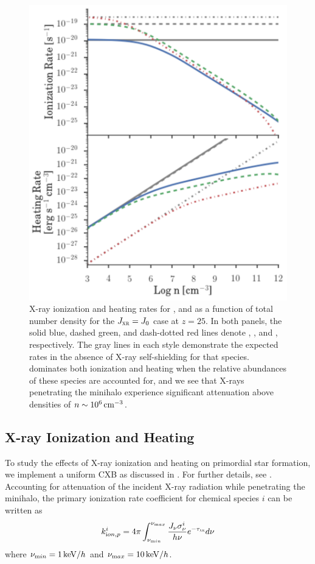 \documentclass[../thesis.tex]{subfiles}
\begin{document}
\begin{figure}
\begin{center}
\includegraphics[width=\columnwidth]{figures/khrates/khratesXR}
\caption{\label{fig:khratesXR}
X-ray ionization and heating rates for \HI, \HeI and \HeII as a function of total number density for the $J_{\textsc{xr}}=J_0$ case at $z=25$. In both panels, the solid blue, dashed green, and dash-dotted red lines denote \HI, \HeI, and \HeII, respectively.  The gray lines in each style demonstrate the expected rates in the absence of X-ray self-shielding for that species.  \HI dominates both ionization and heating when the relative abundances of these species are accounted for, and we see that X-rays penetrating the minihalo experience significant attenuation above densities of $n\sim10^6\,\mathrm{cm}^{-3}$.}
\end{center}
\end{figure}

\subsection{X-ray Ionization and Heating}
\label{xrays}
To study the effects of X-ray ionization and heating on primordial star formation, we implement a uniform CXB as discussed in . For further details, see \citet{Jeonetal2012, Jeonetal2014a}. Accounting for attenuation of the incident X-ray radiation while penetrating the minihalo, the primary ionization rate coefficient for chemical species $i$ can be written as 
\begin{equation}
k^i_{\mathrm ion, p} = 4\pi \int_{\nu_{\mathrm min}}^{\nu_{\mathrm max}}
\frac{J_{\nu} \sigma^i_{\nu}}{h \nu} e^{-\tau_{\textsc{xr}}} d\nu
\end{equation}
where $\nu_{\mathrm min} = 1\,\mathrm{keV}/h$ and $\nu_{\mathrm max} = 10\,\mathrm{keV}/h$.  
\end{document}
